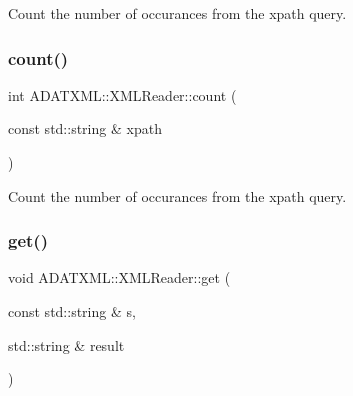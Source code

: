 Count the number of occurances from the xpath query. 

\mbox{\label{classADATXML_1_1XMLReader_a59584913f1338d956de60adef16a0718}} 
\subsubsection{\texorpdfstring{count()}{count()}\hspace{0.1cm}{\footnotesize\ttfamily [3/3]}}
{\footnotesize\ttfamily int A\+D\+A\+T\+X\+M\+L\+::\+X\+M\+L\+Reader\+::count (\begin{DoxyParamCaption}\item[{const std\+::string \&}]{xpath }\end{DoxyParamCaption})}



Count the number of occurances from the xpath query. 

\mbox{\label{classADATXML_1_1XMLReader_a5ed2bbc9de7ba505e6ce37c1a5f90fee}} 
\subsubsection{\texorpdfstring{get()}{get()}\hspace{0.1cm}{\footnotesize\ttfamily [1/30]}}
{\footnotesize\ttfamily void A\+D\+A\+T\+X\+M\+L\+::\+X\+M\+L\+Reader\+::get (\begin{DoxyParamCaption}\item[{const std\+::string \&}]{s,  }\item[{std\+::string \&}]{result }\end{DoxyParamCaption})\hspace{0.3cm}{\ttfamily [inline]}}

